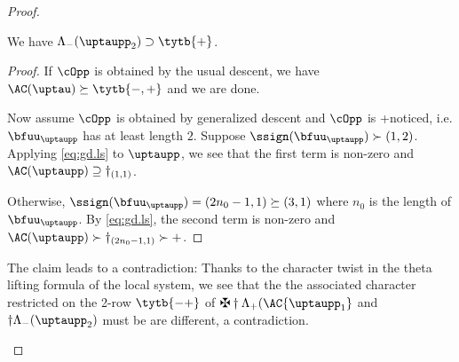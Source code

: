 \documentclass[ssunip]{subfiles}
\begin{document}
\begin{proof}
\begin{enumPF}
\begin{enumPF}
    \begin{claim}\label{c:d+}
      We have $\nAC{\uptaupp_{2}}\supset \tytb{+}$.
    \end{claim}
    \begin{proof}
      If $\cOpp$ is obtained by the usual descent, we have
      $\oAC{\uptau}\succeq \tytb{-,+}$ and we are done.

      Now assume $\cOpp$ is obtained by generalized descent and $\cOpp$ is
      +noticed, i.e. $\bfuu_{\uptaupp}$ has at least length $2$.
      Suppose $\ssign( \bfuu_{\uptaupp} )\succ (1,2)$. Applying \eqref{eq:gd.ls} to $\uptaupp$,
      we see that the first term is non-zero and
      $\oAC{\uptaupp}\supseteq \dagger_{(1,1)}$.

      Otherwise, $\ssign( \bfuu_{\uptaupp} ) = (2n_{0}-1,1)\succeq (3,1)$ where $n_{0}$ is the
      length of $\bfuu_{\uptaupp}$. By \eqref{eq:gd.ls}, the second term is
      non-zero and $\oAC{\uptaupp}\succ \dagger_{(2n_{0}-1,1)}\succ +$.
    \end{proof}

    The claim leads to a contradiction: Thanks to the character twist in the theta
    lifting formula of the local system, we see that the the associated
    character restricted on the 2-row $\tytb{-+}$ of $\maltese \dagger \Lambda_+(\AC{\uptaupp_{1}}$ and
    $\dagger \nAC{\uptaupp_{2}}$ must be are different, a contradiction.


\end{enumPF}
\end{enumPF}
\end{proof}
\end{document}
